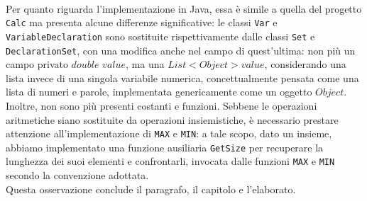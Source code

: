 \documentclass{article}
\begin{document}
\\\noindent 
Per quanto riguarda l'implementazione in Java, essa è simile a quella del progetto \texttt{Calc} ma presenta alcune differenze significative: le classi \texttt{Var} e \\ \texttt{VariableDeclaration} sono sostituite rispettivamente dalle classi \texttt{Set} e \\\texttt{DeclarationSet}, con una modifica anche nel campo di quest'ultima: non più un campo privato $double$ $value$, ma una $List<Object> value$, considerando una lista invece di una singola variabile numerica, concettualmente pensata come una lista di numeri e parole, implementata genericamente come un oggetto $Object$.
\\\noindent
Inoltre, non sono più presenti costanti e funzioni. Sebbene le operazioni aritmetiche siano sostituite da operazioni insiemistiche, è necessario prestare attenzione all'implementazione di \texttt{MAX} e \texttt{MIN}: a tale scopo, dato un insieme, abbiamo implementato una funzione ausiliaria \texttt{GetSize} per recuperare la lunghezza dei suoi elementi e confrontarli, invocata dalle funzioni \texttt{MAX} e \texttt{MIN} secondo la convenzione adottata.
\\\noindent
Questa osservazione conclude il paragrafo, il capitolo e l'elaborato.

\end{document}
